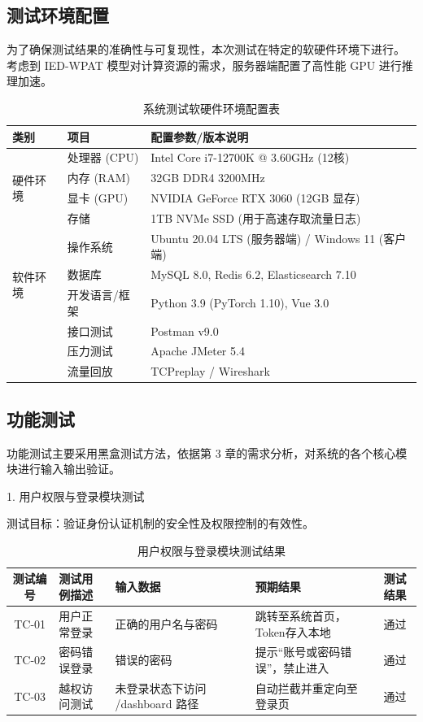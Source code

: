 \subsection{测试环境配置}

为了确保测试结果的准确性与可复现性，本次测试在特定的软硬件环境下进行。
考虑到 IED-WPAT 模型对计算资源的需求，服务器端配置了高性能 GPU 
进行推理加速。
\begin{table}[htbp]
\centering
\caption{系统测试软硬件环境配置表}
\label{tab:5-3}
\begin{tabular}{p{2.5cm} p{3.5cm} p{6.5cm}}
\toprule
类别 & 项目 & 配置参数/版本说明 \\
\midrule
\multirow{4}{*}{硬件环境}
& 处理器 (CPU) & Intel Core i7-12700K @ 3.60GHz (12核) \\
& 内存 (RAM) & 32GB DDR4 3200MHz \\
& 显卡 (GPU) & NVIDIA GeForce RTX 3060 (12GB 显存) \\
& 存储 & 1TB NVMe SSD (用于高速存取流量日志) \\
\midrule
\multirow{4}{*}{软件环境}
& 操作系统 & Ubuntu 20.04 LTS (服务器端) / Windows 11 (客户端) \\
& 数据库 & MySQL 8.0, Redis 6.2, Elasticsearch 7.10 \\
& 开发语言/框架 & Python 3.9 (PyTorch 1.10), Vue 3.0 \\
\midrule
\multirow{3}{*}{测试工具}
& 接口测试 & Postman v9.0 \\
& 压力测试 & Apache JMeter 5.4 \\
& 流量回放 & TCPreplay / Wireshark \\
\bottomrule
\end{tabular}
\end{table}

\subsection{功能测试}

功能测试主要采用黑盒测试方法，依据第 3 章的需求分析，对系统的各个核心模块进行输入输出验证。

1. 用户权限与登录模块测试

测试目标：验证身份认证机制的安全性及权限控制的有效性。

\begin{table}[htbp]
    \centering
    \caption{用户权限与登录模块测试结果}
    \label{tab:login_test}
    \begin{tabular}{c l p{4cm} p{4cm} c}
        \toprule
        测试编号 & 测试用例描述 & 输入数据 & 预期结果 & 测试结果 \\
        \midrule
        TC-01 & 用户正常登录 & 正确的用户名与密码 & 跳转至系统首页，Token存入本地 & 通过 \\
        TC-02 & 密码错误登录 & 错误的密码 & 提示“账号或密码错误”，禁止进入 & 通过 \\
        TC-03 & 越权访问测试 & 未登录状态下访问 /dashboard 路径 & 自动拦截并重定向至登录页 & 通过 \\
        \bottomrule
    \end{tabular}
\end{table}

